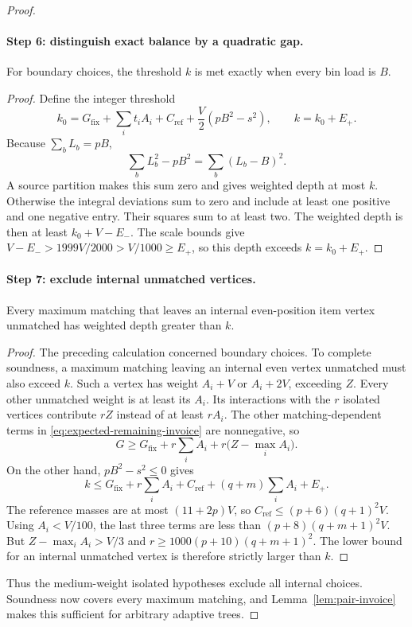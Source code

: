 \begin{proof}
\paragraph{Step 6: distinguish exact balance by a quadratic gap.}
\begin{claim}
For boundary choices, the threshold $k$ is met exactly when every
bin load is $B$.
\end{claim}
\begin{proof}
Define the integer threshold
\[
 k_0=G_{\mathrm{fix}}+\sum_i t_iA_i+C_{\mathrm{ref}}+
              \frac V2(pB^2-s^2),\qquad k=k_0+E_+.
\]
Because $\sum_bL_b=pB$,
\[
 \sum_bL_b^2-pB^2=\sum_b(L_b-B)^2.
\]
A source partition makes this sum zero and gives weighted depth
at most $k$. Otherwise the integral deviations sum to zero and
include at least one positive and one negative entry. Their
squares sum to at least two.
The weighted depth is then at least $k_0+V-E_-$.
The scale bounds give
$V-E_->1999V/2000>V/1000\ge E_+$, so this depth exceeds
$k=k_0+E_+$.
\end{proof}

\paragraph{Step 7: exclude internal unmatched vertices.}
\begin{claim}
Every maximum matching that leaves an internal even-position item
vertex unmatched has weighted depth greater than $k$.
\end{claim}
\begin{proof}
The preceding calculation concerned boundary choices. To complete
soundness, a maximum matching leaving an internal even vertex
unmatched must also exceed $k$.
Such a vertex has weight $A_i+V$ or $A_i+2V$, exceeding $Z$.
Every other unmatched weight is at least its $A_i$.
Its interactions with the $r$ isolated vertices contribute $rZ$
instead of at least $rA_i$. The other matching-dependent terms
in \eqref{eq:expected-remaining-invoice} are nonnegative, so
\[
 G\ge G_{\mathrm{fix}}+r\sum_i A_i+
                   r\bigl(Z-\max_i A_i\bigr).
\]
On the other hand, $pB^2-s^2\le0$ gives
\[
 k\le G_{\mathrm{fix}}+r\sum_i A_i+
           C_{\mathrm{ref}}+(q+m)\sum_i A_i+E_+.
\]
The reference masses are at most $(11+2p)V$, so
$C_{\mathrm{ref}}\le(p+6)(q+1)^2V$.
Using $A_i<V/100$, the last three terms are less than
$(p+8)(q+m+1)^2V$.
But $Z-\max_i A_i>V/3$ and
$r\ge1000(p+10)(q+m+1)^2$.
The lower bound for an internal unmatched vertex is therefore
strictly larger than $k$.
\end{proof}
Thus the medium-weight isolated hypotheses exclude all internal
choices. Soundness now covers every maximum matching, and
Lemma~\ref{lem:pair-invoice} makes this sufficient for arbitrary
adaptive trees.


\end{proof}
